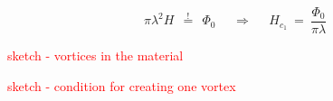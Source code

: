 \documentclass[10pt]{report}
\numberwithin{equation}{chapter}
\begin{document}
\begin{equation}
  \pi \lambda^2 H ~~\overset{!}{=}~~ \Phi_0 ~~~~~~\Rightarrow~~~~~~ H_{c_1} ~=~ \frac{\Phi_0}{\pi \lambda}
\end{equation}




\textcolor{red}{sketch - vortices in the material}

\textcolor{red}{sketch - condition for creating one vortex}




\end{document}
